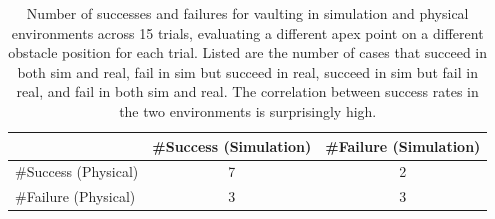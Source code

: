 
 
 \begin{table}
    \vspace*{4pt}
\centering
\caption{Number of successes and failures for vaulting in simulation and physical environments across 15 trials, evaluating a different apex point on a different obstacle position for each trial. Listed are the number of cases that succeed in both sim and real, fail in sim but succeed in real, succeed in sim but fail in real, and fail in both sim and real. The correlation between success rates in the two environments is surprisingly high.}
 \begin{tabular}{ 
l c c}
 \toprule
   & \#Success (Simulation) & \#Failure (Simulation) \\
  \midrule
  \#Success (Physical)&7&2\\
  \#Failure (Physical)&3&3\\
 \bottomrule
\end{tabular}
\vspace*{-5pt}

\label{table:sim_to_real}
\end{table}